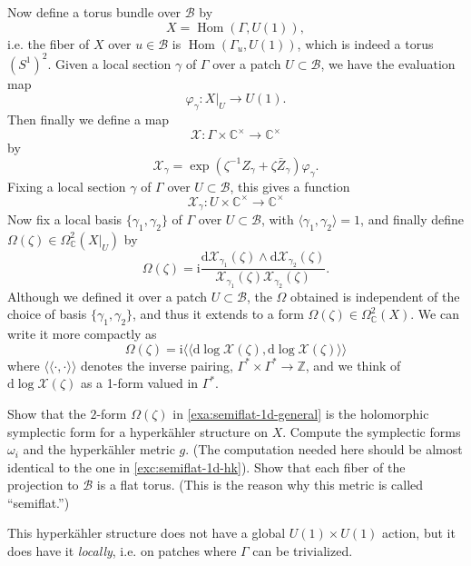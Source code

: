 \documentclass[12pt,letterpaper,reqno]{article}
\numberwithin{equation}{section}
\newcommand{\cB}{\ensuremath{\mathcal B}}
\newcommand{\cX}{\ensuremath{\mathcal X}}
\newcommand{\C}{\ensuremath{\mathbb C}}
\newcommand{\Z}{\ensuremath{\mathbb Z}}
\newcommand{\hk}{hyperk\"ahler\xspace}
\newcommand{\I}{{\mathrm i}}
\newcommand{\de}{\mathrm{d}}
\newcommand{\IP}[1]{\langle#1\rangle}
\newcommand{\DIP}[1]{\langle\!\langle#1\rangle\!\rangle}
\newcommand{\ti}[1]{\textit{#1}}
\DeclareMathOperator{\Hom}{Hom}
\begin{document}
\begin{example}
Now define a torus bundle over $\cB$ by
\begin{equation}
  X = \Hom(\Gamma, U(1)),
\end{equation}
i.e. the fiber of $X$ over $u \in \cB$ is $\Hom(\Gamma_{u}, U(1))$,
which is indeed a torus $(S^1)^2$.
Given a local section $\gamma$ of $\Gamma$ over a patch
$U \subset \cB$, we have the evaluation map
\begin{equation}
  \varphi_\gamma: X \vert_U \to U(1).
\end{equation}
Then finally we define a map
\begin{equation}
  \cX: \Gamma \times \C^\times \to \C^\times
\end{equation}
by
\begin{equation}
  \cX_\gamma = \exp \left(\zeta^{-1} Z_\gamma + \zeta\bar{Z}_\gamma \right) \varphi_\gamma.
\end{equation}
Fixing a local section $\gamma$ of $\Gamma$ over $U \subset \cB$,
this gives a function
\begin{equation}
  \cX_\gamma: U \times \C^\times \to \C^\times
\end{equation}
Now fix a local basis $\{\gamma_1, \gamma_2\}$ of $\Gamma$
over $U \subset \cB$, with $\IP{\gamma_1,\gamma_2} = 1$,
and finally define $\Omega(\zeta) \in \Omega^2_\C(X\vert_U)$
by
\begin{equation}
  \Omega(\zeta) = \I \frac{\de \cX_{\gamma_1}(\zeta) \wedge \de \cX_{\gamma_2}(\zeta)}{\cX_{\gamma_1}(\zeta) \cX_{\gamma_2}(\zeta)}.
\end{equation}
Although we defined it over a patch $U \subset \cB$,
the $\Omega$ obtained is independent of the choice of
basis $\{\gamma_1,\gamma_2\}$, and thus it extends to a form
$\Omega(\zeta) \in \Omega^2_\C(X)$.
We can write it more compactly as
\begin{equation}
  \Omega(\zeta) = \I \DIP{\de \log \cX(\zeta), \de \log \cX(\zeta)}
\end{equation}
where $\DIP{\cdot,\cdot}$ denotes the inverse pairing,
$\Gamma^* \times \Gamma^* \to \Z$, and we think of
$\de \log \cX(\zeta)$ as a 1-form valued in $\Gamma^*$.
\end{example}

\begin{exercise} Show that the $2$-form $\Omega(\zeta)$ in
\autoref{exa:semiflat-1d-general} is the holomorphic symplectic
form for a \hk structure on $X$. Compute the symplectic forms
$\omega_i$ and the \hk metric $g$.
(The computation needed here should be almost 
identical to the one in \autoref{exc:semiflat-1d-hk}).
Show that each fiber of the 
projection to $\cB$ is a flat torus. (This is the reason why
this metric is called ``semiflat.'')
\end{exercise}
This \hk structure does
not have a global $U(1) \times U(1)$ action, but it does have
it \ti{locally}, i.e. on patches where $\Gamma$ can be trivialized.
\end{document}
